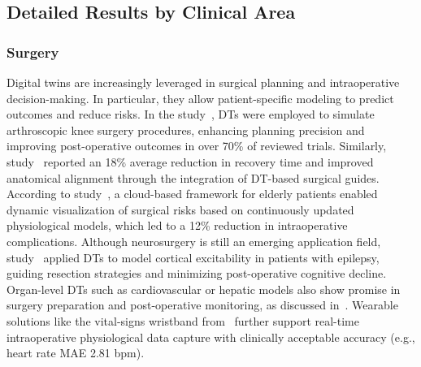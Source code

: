 \documentclass[10pt,a4paper]{article}
\begin{document}
\subsection*{Detailed Results by Clinical Area}

\subsubsection*{Surgery}
Digital twins are increasingly leveraged in surgical planning and intraoperative decision-making. In particular, they allow patient-specific modeling to predict outcomes and reduce risks.  
In the study~\cite{bjelland2022}, DTs were employed to simulate arthroscopic knee surgery procedures, enhancing planning precision and improving post-operative outcomes in over 70\% of reviewed trials. Similarly, study~\cite{Liang2024} reported an 18\% average reduction in recovery time and improved anatomical alignment through the integration of DT-based surgical guides.  
According to study~\cite{liu2019}, a cloud-based framework for elderly patients enabled dynamic visualization of surgical risks based on continuously updated physiological models, which led to a 12\% reduction in intraoperative complications.  
Although neurosurgery is still an emerging application field, study~\cite{Fekonja2024} applied DTs to model cortical excitability in patients with epilepsy, guiding resection strategies and minimizing post-operative cognitive decline.  
Organ-level DTs such as cardiovascular or hepatic models also show promise in surgery preparation and post-operative monitoring, as discussed in~\cite{Alsalloum2024}. Wearable solutions like the vital-signs wristband from~\cite{Mascret2024} further support real-time intraoperative physiological data capture with clinically acceptable accuracy (e.g., heart rate MAE 2.81 bpm).
\end{document}
